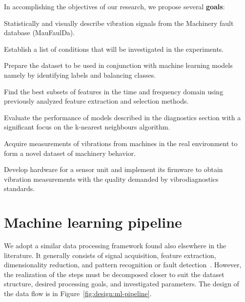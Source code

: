 \noindent In accomplishing the objectives of our research, we propose several \textbf{goals}:
\begin{todolist}
    \itemsep0pt
    \item Statistically and visually describe vibration signals from the Machinery fault database (MauFaulDa).
    \item Establish a list of conditions that will be investigated in the experiments.
    \item Prepare the dataset to be used in conjunction with machine learning models namely by identifying labels and balancing classes.
    \item Find the best subsets of features in the time and frequency domain using previously analyzed feature extraction and selection methods.
    \item Evaluate the performance of models described in the diagnostics section with a significant focus on the k-nearest neighbours algorithm.
    \item Acquire measurements of vibrations from machines in the real environment to form a novel dataset of machinery behavior.
    \item Develop hardware for a sensor unit and implement its firmware to obtain vibration measurements with the quality demanded by vibrodiagnostics standards.
\end{todolist}

\section{Machine learning pipeline}
We adopt a similar data processing framework found also elsewhere in the literature. It generally consists of signal acquisition, feature extraction, dimensionality reduction, and pattern recognition or fault detection~\cite{wang_bearing_2015}. However, the realization of the steps must be decomposed closer to suit the dataset structure, desired processing goals, and investigated parameters. The design of the data flow is in Figure~\ref{fig:design:ml-pipeline}.

